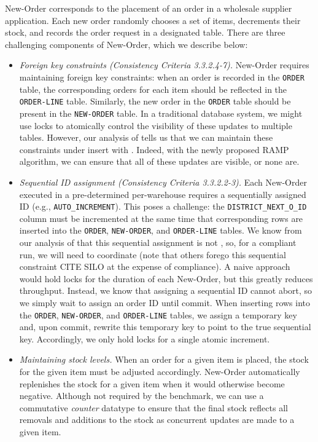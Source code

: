 New-Order corresponds to the placement of an order in a wholesale
supplier application. Each new order randomly chooses a set of items,
decrements their stock, and records the order request in a designated
table. There are three challenging components of New-Order, which we
describe below:
\begin{itemize}

\item \textit{Foreign key constraints (Consistency Criteria
  3.3.2.4-7).} New-Order requires maintaining foreign key constraints:
  when an order is recorded in the \texttt{ORDER} table, the
  corresponding orders for each item should be reflected in the
  \texttt{ORDER-LINE} table. Similarly, the new order in the
  \texttt{ORDER} table should be present in the \texttt{NEW-ORDER}
  table. In a traditional database system, we might use locks to
  atomically control the visibility of these updates to multiple
  tables. However, our analysis of \lang tells us that we can maintain
  these constraints under insert with \cfreedom. Indeed, with the
  newly proposed \cfree RAMP algorithm, we can ensure that all of
  these updates are visible, or none are.

\item \textit{Sequential ID assignment (Consistency Criteria
  3.3.2.2-3).} Each New-Order executed in a pre-determined
  per-warehouse requires a sequentially assigned ID (e.g.,
  \texttt{AUTO\_INCREMENT}). This poses a challenge: the
  \texttt{DISTRICT\_NEXT\_O\_ID} column must be incremented at the
  same time that corresponding rows are inserted into the
  \texttt{ORDER}, \texttt{NEW-ORDER}, and \texttt{ORDER-LINE}
  tables. We know from our analysis of \lang that this sequential
  assignment is not \cfree, so, for a compliant run, we will need to
  coordinate (note that others forego this sequential constraint CITE
  SILO at the expense of compliance). A naive approach would hold
  locks for the duration of each New-Order, but this greatly reduces
  throughput. Instead, we know that assigning a sequential ID cannot
  abort, so we simply wait to assign an order ID until commit. When
  inserting rows into the \texttt{ORDER}, \texttt{NEW-ORDER}, and
  \texttt{ORDER-LINE} tables, we assign a temporary key and, upon
  commit, rewrite this temporary key to point to the true sequential
  key. Accordingly, we only hold locks for a single atomic increment.

\item \textit{Maintaining stock levels.} When an order for a given
  item is placed, the stock for the given item must be adjusted
  accordingly. New-Order automatically replenishes the stock for a
  given item when it would otherwise become negative. Although not
  required by the benchmark, we can use a commutative \textit{counter}
  datatype to ensure that the final stock reflects all removals and
  additions to the stock as concurrent updates are made to a given item.
\end{itemize}

